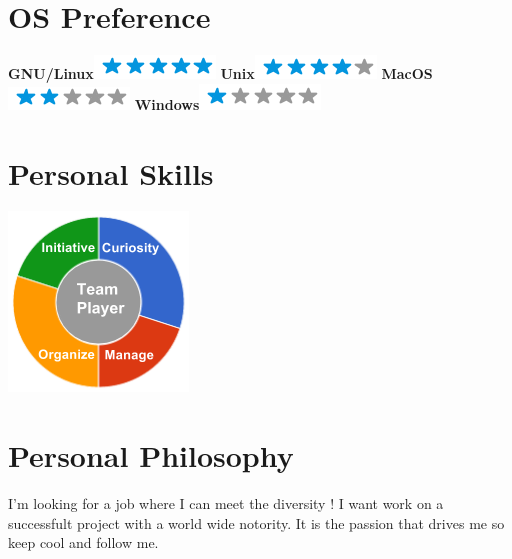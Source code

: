 \documentclass[]{friggeri-cv}
\begin{document}
\begin{aside}
  \section{OS Preference}
    \textbf{GNU/Linux}\includegraphics[scale=0.40]{img/5stars.png}
    \textbf{Unix}\includegraphics[scale=0.40]{img/4stars.png}
    \textbf{MacOS}\includegraphics[scale=0.40]{img/2stars.png}
    \textbf{Windows}\includegraphics[scale=0.40]{img/1stars.png}
    ~
  \section{Personal Skills}
    \includegraphics[scale=0.62]{img/personal.png}
    ~
\end{aside}

\section{Personal Philosophy}
    I'm looking for a job where I can meet the diversity ! I want work on a successfult project with a world wide notority.
    It is the passion that drives me so keep cool and follow me.
\end{document}
